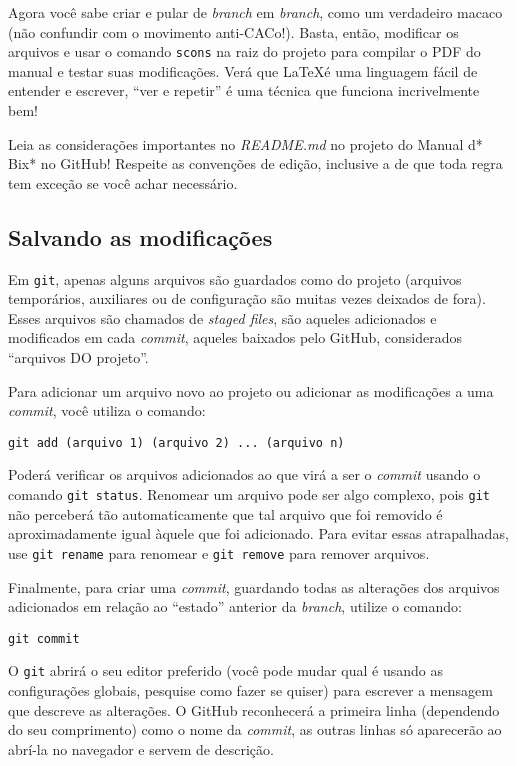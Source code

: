 \documentclass[a4paper,oneside,10pt]{memoir}
\begin{document}
Agora você sabe criar e pular de \emph{branch} em \emph{branch}, como um
verdadeiro macaco (não confundir com o movimento anti-CACo!). Basta, então,
modificar os arquivos e usar o comando \texttt{scons} na raiz do projeto para
compilar o PDF do manual e testar suas modificações. Verá que \LaTeX é uma
linguagem fácil de entender e escrever, ``ver e repetir'' é uma técnica que
funciona incrivelmente bem!

Leia as considerações importantes no \emph{README.md} no projeto do Manual d*
Bix* no GitHub! Respeite as convenções de edição, inclusive a de que toda regra
tem exceção se você achar necessário.

\subsection{Salvando as modificações}

Em \texttt{git}, apenas alguns arquivos são guardados como do projeto (arquivos
temporários, auxiliares ou de configuração são muitas vezes deixados de fora).
Esses arquivos são chamados de \emph{staged files}, são aqueles adicionados e
modificados em cada \emph{commit}, aqueles baixados pelo GitHub, considerados
``arquivos DO projeto''.

Para adicionar um arquivo novo ao projeto ou adicionar as modificações a uma
\emph{commit}, você utiliza o comando:

\begin{center}
\texttt{git add (arquivo 1) (arquivo 2) ... (arquivo n)}
\end{center}

Poderá verificar os arquivos adicionados ao que virá a ser o \emph{commit}
usando o comando \texttt{git status}. Renomear um arquivo pode ser algo
complexo, pois \texttt{git} não perceberá tão automaticamente que tal arquivo
que foi removido é aproximadamente igual àquele que foi adicionado. Para evitar
essas atrapalhadas, use \texttt{git rename} para renomear e \texttt{git remove}
para remover arquivos.

Finalmente, para criar uma \emph{commit}, guardando todas as alterações dos
arquivos adicionados em relação ao ``estado'' anterior da \emph{branch},
utilize o comando:

\begin{center}
\texttt{git commit}
\end{center}

O \texttt{git} abrirá o seu editor preferido (você pode mudar qual é usando as
configurações globais, pesquise como fazer se quiser) para escrever a mensagem
que descreve as alterações. O GitHub reconhecerá a primeira linha (dependendo
do seu comprimento) como o nome da \emph{commit}, as outras linhas só
aparecerão ao abrí-la no navegador e servem de descrição.
\end{document}
